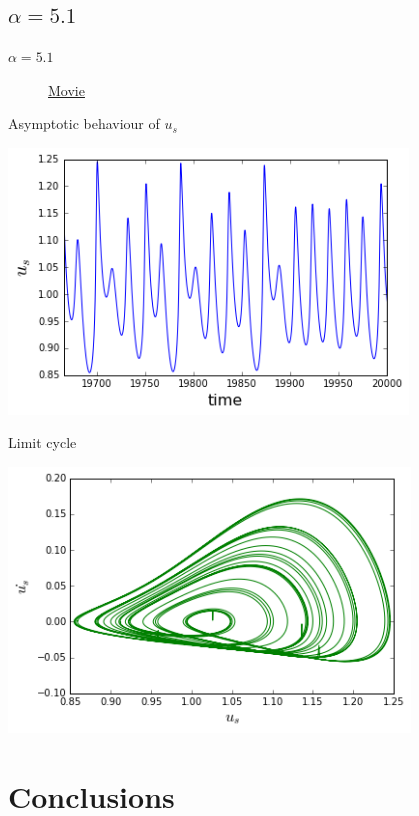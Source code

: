 \documentclass{beamer}
\begin{document}
\subsection{$\alpha = 5.1$}
\begin{frame}{$\alpha = 5.1$}
	\begin{figure}[h!]
\href{https://www.youtube.com/watch?v=BFadoM801yg}{Movie} 
	\end{figure} 
\end{frame}
\begin{frame}{Asymptotic behaviour of $u_s$}
	\begin{center}
		\includegraphics[height=200pt]{51}\\
		
	\end{center}	
\end{frame}
\begin{frame}{Limit cycle}
	\begin{center}
		\includegraphics[height=200pt]{lim51}\\
		
	\end{center}	
\end{frame}
\section{Conclusions}
\end{document}
